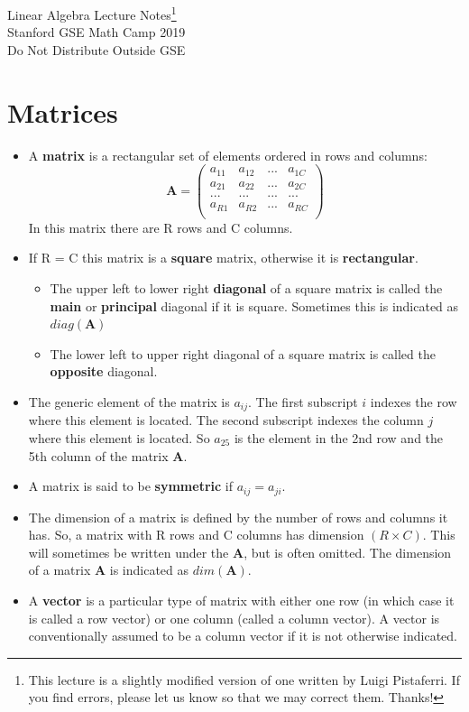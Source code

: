 \documentclass[11pt]{article}
\theoremstyle{definition}
\theoremstyle{remark}
\begin{document}
\begin{center}
{\huge Linear Algebra Lecture Notes\footnote{This lecture is a slightly modified version of one written by Luigi Pistaferri. If you find errors, please let us know so that we may correct them. Thanks!}} \\[5pt]
{\Large Stanford GSE Math Camp 2019 \\[5pt]
Do Not Distribute Outside GSE}
\end{center}

\section{Matrices}
\begin{itemize}
\item A \textbf{matrix} is a rectangular set of elements ordered in rows and columns:
$$
\textbf{A} =
\begin{pmatrix}
a_{11}&a_{12}&...&a_{1C}\\
a_{21}&a_{22}&...&a_{2C}\\
...&...&...&...\\
a_{R1}&a_{R2}&...&a_{RC}\\
\end{pmatrix}
$$
In this matrix there are R rows and C columns.
\item If R = C this matrix is a \textbf{square} matrix, otherwise it is \textbf{rectangular}.
\begin{itemize}
\item The upper left to lower right \textbf{diagonal} of a square matrix is called the \textbf{main} or \textbf{principal} diagonal if it is square. Sometimes this is indicated as $diag(\mathbf{A})$
\item The lower left to upper right diagonal of a square matrix is called the \textbf{opposite} diagonal.
\end{itemize}
\item The generic element of the matrix is $a_{ij}$. The first subscript $i$ indexes the row where this element is located. The second subscript indexes the column $j$ where this element is located. So $a_{25}$ is the element in the 2nd row and the 5th column of the matrix \textbf{A}.
\item A matrix is said to be \textbf{symmetric} if $a_{ij}=a_{ji}$.
\item The dimension of a matrix is defined by the number of rows and columns it has. So, a matrix with R rows and C columns has dimension $(R \times C)$. This will sometimes be written under the \textbf{A}, but is often omitted. The dimension of a matrix \textbf{A} is indicated as $dim(\mathbf{A})$.
\item A \textbf{vector} is a particular type of matrix with either one row (in which case it is called a row vector) or one column (called a column vector). A vector is conventionally assumed to be a column vector if it is not otherwise indicated.


\end{itemize}
\end{document}
